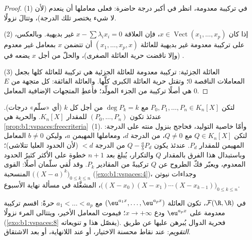 \begin{proof}
(1) في تركيبة معدومة، انظر في أكبر درجة حاضرة: فعلى
معاملها أن ينعدم (لأن لا شيء يختصر تلك الدرجة)، وتتالَ
نزولًا.

(2) إذا كان $x \in \operatorname{Vect}(x_1, \dots, x_p)$، فإن العلاقة $x
- \sum\lambda_i x_i = 0$ غير بديهية. وبالعكس، على تركيبة معدومة
غير بديهية للعائلة $(x_1, \dots, x_p, x)$ أن تتضمن $x$ بمعامل
غير معدوم (وإلا ناقضت حرية العائلة
الصغرى)، والحلّ من أجل $x$ يضعه في .

(3) العائلة الجزئية: تركيبة معدومة للعائلة الجزئية هي تركيبة
للعائلة كلها بجعل المعاملات الناقصة $0$؛ وتقتل حرية
العائلة الكبرى كلَّها. والعائلة الفائقة: كل متجهة
من $E$ هي أصلًا تركيبة من الجزء المولِّد؛ فأعطِ
المتجهات الإضافية المعامل $0$.
\end{proof}

\begin{example}
\label{ex:b1:vspaces:staircase}
لتكن $P_0, P_1, \dots, P_n \in K_n[X]$ مع $\deg P_k = k$ من أجل كل
$k$ (أي «سلّم» درجات). عندئذ تكون $(P_0, \dots, P_n)$
 للمقدار $K_n[X]$. والحرية هي
\cref{prop:b1:vspaces:freecriteria}~(1). وأمّا خاصية
التوليد، فحاجج بنزول منته على الدرجة: لتكن $Q \in
K_n[X]$ مع $Q \neq 0$، من الدرجة $d$، ومعاملها المهيمن $a$،
وليكن $b \neq 0$ المعامل المهيمن للمقدار $P_d$. عندئذ يكون $Q -
\frac ab P_d$ من الدرجة $< d$ (لأن الحدود العليا تتلاشى)؛ وباستبدال
هذا الفرق بالمقدار $Q$ والتكرار، يُبلغ بعد $n + 1$ خطوة على الأكثر
كثيرُ الحدود المعدوم، ويعبّر فكّ الطروح عن $Q$
تركيبةً من المقادير $P_k$. وقد لُقي سلّمان أصلًا:
القوى المنسحبة $\bigl((X-a)^k\bigr)_{0 \leq k
\leq n}$ (\cref{exo:b1:vspaces:4})، وجداءات نيوتن
$\bigl((X - x_0)(X - x_1)\cdots(X - x_{k-1})\bigr)_{0 \leq k \leq
n}$، المشغَّلة في مسألة نهاية الأسبوع.
\end{example}

\begin{example}\label{ex:b1:vspaces:functionfree}
في $\mathcal{F}(\R,\R)$، تكون العائلة $(\eu^{a_1 x}, \dots, \eu^{a_p
x})$ مع $a_1 < \dots < a_p$ حرةً: اقسم تركيبة معدومة على
$\eu^{a_p x}$ ودع $x \to +\infty$؛ فيموت المعامل الأخير،
ويتتالى المرء نزولًا (\cref{exo:b1:vspaces:8} يفصّل هذا و
تنويعاته). فحرية الدوال يُبرهن عليها عن طريق \emph{التقويم}:
عند نقاط محسنة الاختيار، أو عند اللانهاية، أو بعد الاشتقاق.
\end{example}

